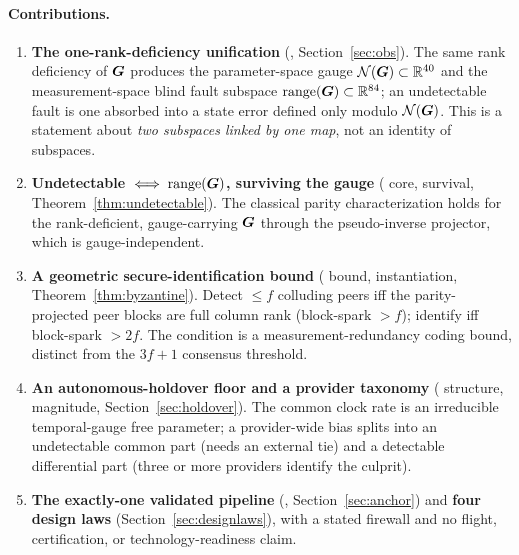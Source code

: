\paragraph{Contributions.}
\begin{enumerate}
  \item \textbf{The one-rank-deficiency unification} (\Proven{}, Section~\ref{sec:obs}). The
  same rank deficiency of $\bm{G}$ produces the parameter-space gauge
  $\mathcal{N}(\bm{G})\subset\mathbb{R}^{40}$ and the measurement-space blind fault subspace
  $\operatorname{range}(\bm{G})\subset\mathbb{R}^{84}$; an undetectable fault is one absorbed into a state error
  defined only modulo $\mathcal{N}(\bm{G})$. This is a statement about \emph{two subspaces linked by
  one map}, not an identity of subspaces.
  \item \textbf{Undetectable $\iff\operatorname{range}(\bm{G})$, surviving the gauge} (\Cited{} core,
  \Proven{} survival, Theorem~\ref{thm:undetectable}). The classical parity characterization
  holds for the rank-deficient, gauge-carrying $\bm{G}$ through the pseudo-inverse projector,
  which is gauge-independent.
  \item \textbf{A geometric secure-identification bound} (\Cited{} bound, \Proven{}
  instantiation, Theorem~\ref{thm:byzantine}). Detect $\le f$ colluding peers iff the
  parity-projected peer blocks are full column rank (block-spark $>f$); identify iff
  block-spark $>2f$. The condition is a measurement-redundancy coding bound, distinct from
  the $3f+1$ consensus threshold.
  \item \textbf{An autonomous-holdover floor and a provider taxonomy} (\Proven{} structure,
  \Modelled{} magnitude, Section~\ref{sec:holdover}). The common clock rate is an irreducible
  temporal-gauge free parameter; a provider-wide bias splits into an undetectable common part
  (needs an external tie) and a detectable differential part (three or more providers
  identify the culprit).
  \item \textbf{The exactly-one validated pipeline} (\Validated{}, Section~\ref{sec:anchor})
  and \textbf{four design laws} (Section~\ref{sec:designlaws}), with a stated firewall and no
  flight, certification, or technology-readiness claim.
\end{enumerate}

